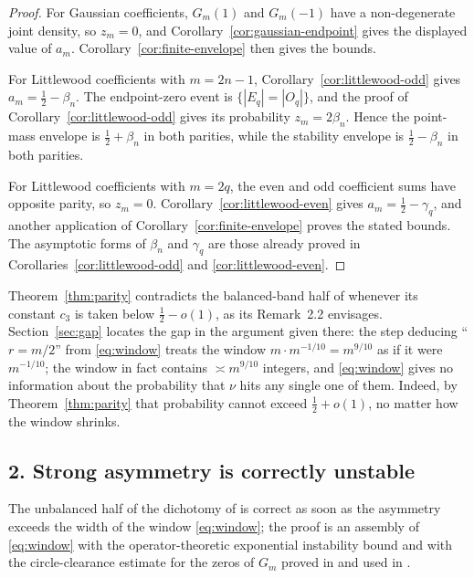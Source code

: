 \documentclass[11pt]{article}
\begin{document}
\begin{proof}
For Gaussian coefficients, \(G_m(1)\) and \(G_m(-1)\) have a non-degenerate
joint density, so \(z_m=0\), and Corollary~\ref{cor:gaussian-endpoint} gives
the displayed value of \(a_m\).  Corollary~\ref{cor:finite-envelope} then gives
the bounds.

For Littlewood coefficients with \(m=2n-1\), Corollary~\ref{cor:littlewood-odd}
gives \(a_m=\tfrac12-\beta_n\).  The endpoint-zero event is
\(\{|E_q|=|O_q|\}\), and the proof of Corollary~\ref{cor:littlewood-odd} gives
its probability \(z_m=2\beta_n\).  Hence the point-mass envelope is
\(\tfrac12+\beta_n\) in both parities, while the stability envelope is
\(\tfrac12-\beta_n\) in both parities.

For Littlewood coefficients with \(m=2q\), the even and odd coefficient sums have
opposite parity, so \(z_m=0\).  Corollary~\ref{cor:littlewood-even} gives
\(a_m=\tfrac12-\gamma_q\), and another application of
Corollary~\ref{cor:finite-envelope} proves the stated bounds.  The asymptotic
forms of \(\beta_n\) and \(\gamma_q\) are those already proved in
Corollaries~\ref{cor:littlewood-odd} and \ref{cor:littlewood-even}.
\end{proof}

Theorem~\ref{thm:parity} contradicts the balanced-band half of
\cite[Theorem~2.1]{Manrique} whenever its constant $c_3$ is taken below
$\tfrac12-o(1)$, as its Remark~2.2 envisages.  Section~\ref{sec:gap} locates the
gap in the argument given there: the step deducing ``$r=m/2$'' from
\eqref{eq:window} treats the window $m\cdot m^{-1/10}=m^{9/10}$ as if it were
$m^{-1/10}$; the window in fact contains $\asymp m^{9/10}$ integers, and
\eqref{eq:window} gives no information about the probability that $\nu$ hits any
single one of them.  Indeed, by Theorem~\ref{thm:parity} that probability cannot
exceed $\tfrac12+o(1)$, no matter how the window shrinks.

\subsection*{2.  Strong asymmetry is correctly unstable}

The unbalanced half of the dichotomy of \cite{Manrique} is correct as soon as the
asymmetry exceeds the width of the window \eqref{eq:window}; the proof is an
assembly of \eqref{eq:window} with the operator-theoretic exponential instability
bound and with the circle-clearance estimate for the zeros of $G_m$ proved in
\cite{KMS} and used in \cite{Manrique}.
\end{document}

